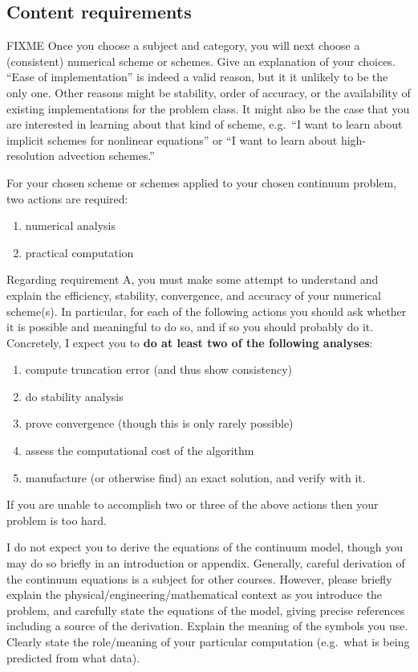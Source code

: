 \documentclass[11pt]{amsart}
\begin{document}
\subsection*{Content requirements}  FIXME Once you choose a subject and category, you will next choose a (consistent) numerical scheme or schemes.  Give an explanation of your choices.  ``Ease of implementation'' is indeed a valid reason, but it it unlikely to be the only one.  Other reasons might be stability, order of accuracy, or the availability of existing implementations for the problem class.  It might also be the case that you are interested in learning about that kind of scheme, e.g.~``I want to learn about implicit schemes for nonlinear equations'' or ``I want to learn about high-resolution advection schemes.''

For your chosen scheme or schemes applied to your chosen continuum problem, two actions are required:
\renewcommand{\labelenumi}{\Alph{enumi}.}
\begin{enumerate}
\item numerical analysis
\item practical computation
\end{enumerate}

Regarding requirement A, you must make some attempt to understand and explain the efficiency, stability, convergence, and accuracy of your numerical scheme(s).  In particular, for each of the following actions you should ask whether it is possible and meaningful to do so, and if so you should probably do it.  Concretely, I expect you to \textbf{do at least two of the following analyses}:
\renewcommand{\labelenumi}{\roman{enumi}.}
\begin{enumerate}
\item compute truncation error (and thus show consistency)
\item do stability analysis
\item prove convergence (though this is only rarely possible)
\item assess the computational cost of the algorithm
\item manufacture (or otherwise find) an exact solution, and verify with it.
\end{enumerate}
If you are unable to accomplish two or three of the above actions then your problem is too hard.

I do not expect you to derive the equations of the continuum model, though you may do so briefly in an introduction or appendix.  Generally, careful derivation of the continuum equations is a subject for other courses.  However, please briefly explain the physical/engineering/mathematical context as you introduce the problem, and carefully state the equations of the model, giving precise references including a source of the derivation.  Explain the meaning of the symbols you use.  Clearly state the role/meaning of your particular computation (e.g.~what is being predicted from what data).
\end{document}
